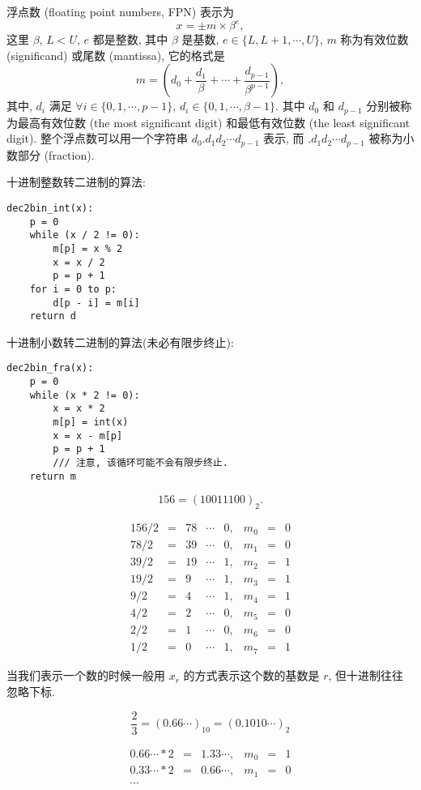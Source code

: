\documentclass[a4paper]{ctexart}
\begin{document}
 浮点数 (floating point numbers, FPN)
表示为
$$
x = \pm m \times \beta^e,
$$
这里 $\beta$, $L < U$, $e$ 都是整数, 其中 $\beta$ 是基数,
$e \in \{L, L + 1, \cdots, U\}$,
$m$ 称为有效位数 (significand) 或尾数 (mantissa), 它的格式是
$$
m = \left(d_0 + \frac{d_1}{\beta} + \cdots
+ \frac{d_{p - 1}}{\beta^{p - 1}}\right),
$$
其中, $d_i$ 满足 $\forall i \in \{0, 1, \cdots, p - 1\}$,
$d_i \in \{0, 1, \cdots, \beta - 1\}$. 其中 $d_0$ 和
$d_{p - 1}$ 分别被称为最高有效位数 (the most significant digit)
和最低有效位数 (the least significant digit).
整个浮点数可以用一个字符串 $d_0.d_1d_2\cdots d_{p - 1}$ 表示, 而
$.d_1d_2\cdots d_{p - 1}$ 被称为小数部分 (fraction).

 十进制整数转二进制的算法:
\begin{verbatim}
dec2bin_int(x):
    p = 0
    while (x / 2 != 0):
        m[p] = x % 2
        x = x / 2
        p = p + 1
    for i = 0 to p:
        d[p - i] = m[i]
    return d
\end{verbatim}
十进制小数转二进制的算法(未必有限步终止):
\begin{verbatim}
dec2bin_fra(x):
    p = 0
    while (x * 2 != 0):
        x = x * 2
        m[p] = int(x)
        x = x - m[p]
        p = p + 1
        /// 注意, 该循环可能不会有限步终止.
    return m
\end{verbatim}

$$
156 = (10011100)_2.
$$

$$
\begin{array}{rclclrcl}
  156 / 2 &=& 78 &\cdots& 0,& m_0 &=& 0 \\
  78 / 2 &=& 39 &\cdots& 0,& m_1 &=& 0 \\
  39 / 2 &=& 19 &\cdots& 1,& m_2 &=& 1\\
  19 / 2 &=& 9 &\cdots& 1,& m_3 &=& 1\\
  9 / 2 &=& 4 &\cdots& 1,& m_4 &=& 1\\
  4 / 2 &=& 2 &\cdots& 0,& m_5 &=& 0\\
  2 / 2 &=& 1 &\cdots& 0,& m_6 &=& 0\\
  1 / 2 &=& 0 &\cdots& 1,& m_7 &=& 1
\end{array}
$$

当我们表示一个数的时候一般用 $x_r$ 的方式表示这个数的基数是 $r$,
但十进制往往忽略下标.

$$
\frac{2}{3} = (0.66\cdots)_{10} = (0.1010\cdots)_2
$$

$$
\begin{array}{rclrcl}
  0.66\cdots * 2 &=& 1.33\cdots, & m_0 &=& 1 \\
  0.33\cdots * 2 &=& 0.66\cdots, & m_1 &=& 0 \\
  \cdots&&&&&
\end{array}
$$
\end{document}
